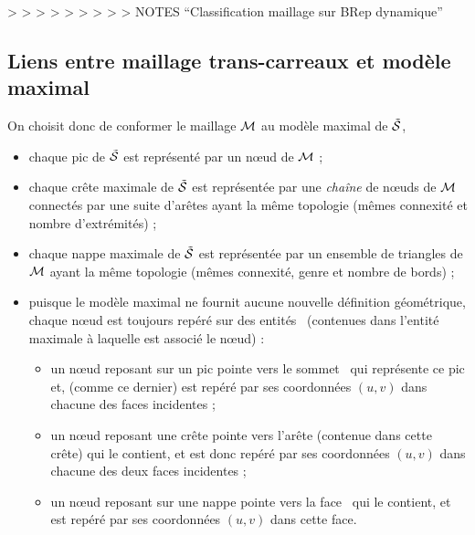 > > > > > > > > > NOTES ``Classification maillage sur BRep dynamique''
\subsection{Liens entre maillage trans-carreaux et modèle maximal}
On choisit donc de conformer le maillage $\mathcal{M}$ au modèle maximal de $\tilde{\mathcal{S}}$, \ie
    \begin{itemize}
        \item chaque pic de $\tilde{\mathcal{S}}$ est représenté par un n\oe ud de $\mathcal{M}$ ;
        \item chaque crête maximale de $\tilde{\mathcal{S}}$ est représentée par une \textit{chaîne} de n\oe uds de $\mathcal{M}$ connectés par une suite d'arêtes ayant la même topologie (\ie mêmes connexité et nombre d'extrémités) ;
        \item chaque nappe maximale de $\tilde{\mathcal{S}}$ est représentée par un ensemble de triangles de $\mathcal{M}$ ayant la même topologie (\ie mêmes connexité, genre et nombre de bords) ;
        \item puisque le modèle maximal ne fournit aucune nouvelle définition géométrique, chaque n\oe ud est toujours repéré sur des entités \brep\ (contenues dans l'entité maximale à laquelle est associé le n\oe ud) :
        \begin{itemize}
            \item un n\oe ud reposant sur un pic pointe vers le sommet \brep\ qui représente ce pic et, (comme ce dernier) est repéré par ses coordonnées $(u,v)$ dans chacune des faces incidentes ;%
            \item un n\oe ud reposant une crête pointe vers l'arête (contenue dans cette crête) qui le contient, et est donc repéré par ses coordonnées $(u,v)$ dans chacune des deux faces incidentes ;
            \item un n\oe ud reposant sur une nappe pointe vers la face \brep\ qui le contient, et est repéré par ses coordonnées $(u,v)$ dans cette face.
        \end{itemize}
    \end{itemize}


